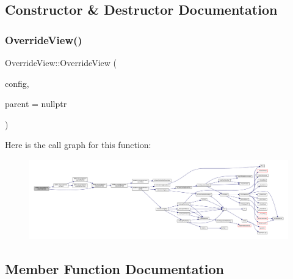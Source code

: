 \subsection{Constructor \& Destructor Documentation}
\mbox{\label{class_q_g_b_a_1_1_override_view_aeffecd39b66b4c445a1d88f13d64ac78}} 
\subsubsection{\texorpdfstring{Override\+View()}{OverrideView()}}
{\footnotesize\ttfamily Override\+View\+::\+Override\+View (\begin{DoxyParamCaption}\item[{\mbox{\hyperlink{class_q_g_b_a_1_1_config_controller}{Config\+Controller}} $\ast$}]{config,  }\item[{Q\+Widget $\ast$}]{parent = {\ttfamily nullptr} }\end{DoxyParamCaption})}

Here is the call graph for this function\+:
\nopagebreak
\begin{figure}[H]
\begin{center}
\leavevmode
\includegraphics[width=350pt]{class_q_g_b_a_1_1_override_view_aeffecd39b66b4c445a1d88f13d64ac78_cgraph}
\end{center}
\end{figure}


\subsection{Member Function Documentation}
\mbox{\label{class_q_g_b_a_1_1_override_view_a0c94739bda5d5540784d4f1f72c88805}} 
